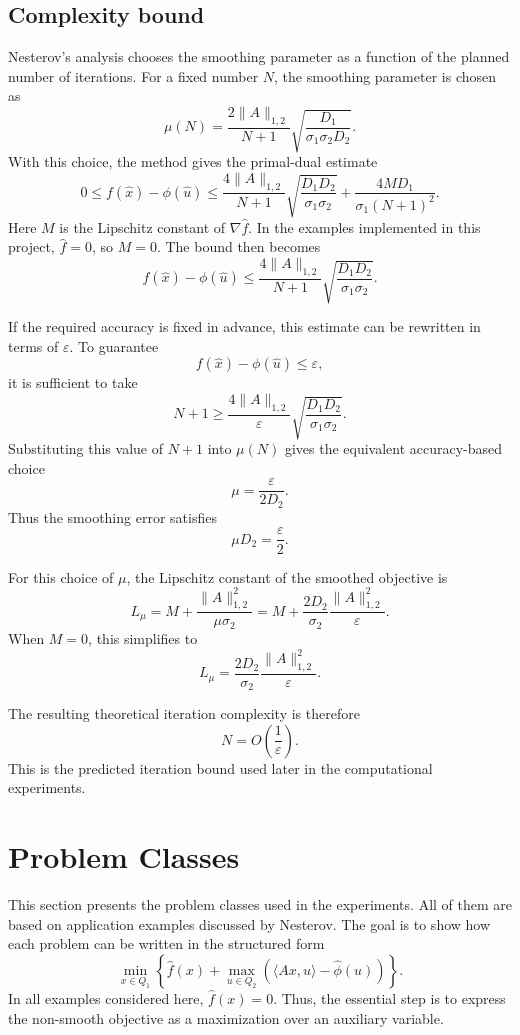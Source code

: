 \documentclass[11pt]{article}
\begin{document}
\subsection{Complexity bound}

Nesterov's analysis chooses the smoothing parameter as a function of the planned
number of iterations. For a fixed number \(N\), the smoothing parameter is chosen
as
\[
    \mu(N)
    =
    \frac{2\|A\|_{1,2}}{N+1}
    \sqrt{
        \frac{D_1}{\sigma_1\sigma_2D_2}
    }.
\]
With this choice, the method gives the primal-dual estimate
\[
    0
    \le
    f(\hat x)-\phi(\hat u)
    \le
    \frac{4\|A\|_{1,2}}{N+1}
    \sqrt{
        \frac{D_1D_2}{\sigma_1\sigma_2}
    }
    +
    \frac{4MD_1}{\sigma_1(N+1)^2}.
\]
Here \(M\) is the Lipschitz constant of \(\nabla\hat f\). In the examples
implemented in this project, \(\hat f=0\), so \(M=0\). The bound then becomes
\[
    f(\hat x)-\phi(\hat u)
    \le
    \frac{4\|A\|_{1,2}}{N+1}
    \sqrt{
        \frac{D_1D_2}{\sigma_1\sigma_2}
    }.
\]

If the required accuracy is fixed in advance, this estimate can be rewritten in
terms of \(\varepsilon\). To guarantee
\[
    f(\hat x)-\phi(\hat u)\le\varepsilon,
\]
it is sufficient to take
\[
    N+1
    \ge
    \frac{4\|A\|_{1,2}}{\varepsilon}
    \sqrt{
        \frac{D_1D_2}{\sigma_1\sigma_2}
    }.
\]
Substituting this value of \(N+1\) into \(\mu(N)\) gives the equivalent
accuracy-based choice
\[
    \mu
    =
    \frac{\varepsilon}{2D_2}.
\]
Thus the smoothing error satisfies
\[
    \mu D_2=\frac{\varepsilon}{2}.
\]

For this choice of \(\mu\), the Lipschitz constant of the smoothed objective is
\[
    L_\mu
    =
    M+
    \frac{\|A\|_{1,2}^2}{\mu\sigma_2}
    =
    M+
    \frac{2D_2}{\sigma_2}
    \frac{\|A\|_{1,2}^2}{\varepsilon}.
\]
When \(M=0\), this simplifies to
\[
    L_\mu
    =
    \frac{2D_2}{\sigma_2}
    \frac{\|A\|_{1,2}^2}{\varepsilon}.
\]

The resulting theoretical iteration complexity is therefore
\[
    N=O\left(\frac{1}{\varepsilon}\right).
\]
This is the predicted iteration bound used later in the computational
experiments.



\section{Problem Classes}

This section presents the problem classes used in the experiments. All of them
are based on application examples discussed by Nesterov. The goal is to show how
each problem can be written in the structured form
\[
    \min_{x\in Q_1}
    \left\{
        \hat f(x)
        +
        \max_{u\in Q_2}
        \left(
            \langle Ax,u\rangle-\hat\phi(u)
        \right)
    \right\}.
\]
In all examples considered here, \(\hat f(x)=0\). Thus, the essential step is
to express the non-smooth objective as a maximization over an auxiliary
variable.
\end{document}
